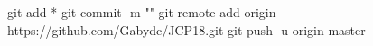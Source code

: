 git add *
git commit -m ""
git remote add origin https://github.com/Gabydc/JCP18.git
git push -u origin master
